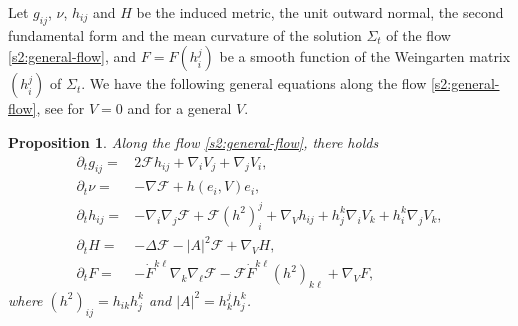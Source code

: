\documentclass[11pt,reqno]{amsart}
\newtheorem{prop}[thm]{Proposition}
\theoremstyle{definition}
\theoremstyle{remark}
\numberwithin{equation}{section}
\renewcommand{\(}{\left(}
\renewcommand{\)}{\right)}
\renewcommand{\-}{\overline}
\newcommand{\D}{\Delta}
\begin{document}
Let $g_{ij}$, $\nu$, $h_{ij}$ and $H$ be the induced metric, the unit outward normal, the second fundamental form and the mean curvature of the solution $\Sigma_t$ of the flow \eqref{s2:general-flow}, and $F=F(h_i^j)$ be a smooth function of the Weingarten matrix $(h_i^j)$ of $\Sigma_t$. We have the following general equations along the flow \eqref{s2:general-flow}, see \cite{HP99} for $V=0$ and  \cite[Proposition 2.7]{Wang-Weng-Xia2022} for a general $V$.
\begin{prop}\label{s3:prop-evol-general-flow}
Along the flow \eqref{s2:general-flow}, there holds
\begin{align}
\partial_t g_{ij}=&2\mathcal{F}h_{ij}+\nabla_i V_j+\nabla_j V_i, \label{s2:metric-general-f}\\
\partial_t \nu=&-\nabla \mathcal{F}+h(e_i,V)e_i, \label{s2:normal-general-f}\\
\partial_t h_{ij}=&-\nabla_i\nabla_j \mathcal{F}+\mathcal{F} (h^2)_i^j+\nabla_V h_{ij}+h_j^k \nabla_i V_k+h_i^k \nabla_j V_k,\label{s2:hij-general-f}\\
\partial_t H=&-\D \mathcal{F}-|A|^2 \mathcal{F}+\nabla_V H,\label{s2:H-general-f}\\
\partial_t F=&-\dot{F}^{k\ell}\nabla_k\nabla_\ell \mathcal{F}-\mathcal{F}\dot{F}^{k\ell} (h^2)_{k\ell}+\nabla_V F, \label{s2:F-general-f}
\end{align}
where $(h^2)_{ij}=h_{ik}h^k_j$ and $|A|^2=h^j_k h^k_j$.
\end{prop}
\end{document}
